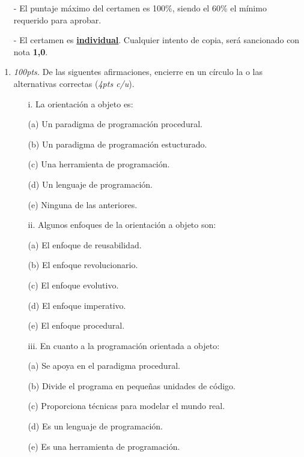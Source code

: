 \documentclass[10pt]{article}
\begin{document}
{\scriptsize
\begin{itemize}
    \item[-] El puntaje m\'aximo del certamen es 100\%, siendo el 60\% el m\'inimo requerido para aprobar.
    \item[-] El certamen es \underline{\textbf{individual}}. Cualquier intento de copia, ser\'a sancionado con nota \textbf{1,0}.
\end{itemize}
\vspace*{10pt}

\vspace*{-30pt}

\begin{enumerate}

    \item \emph{100pts.} De las siguentes afirmaciones, encierre en un c\'irculo la o las alternativas correctas (\emph{4pts c/u}).
    \begin{multicols}{2}

	\begin{enumerate}[label=(\alph*)]
        \item[i.] La orientaci\'on a objeto es: 
        \item[(a)] Un paradigma de programaci\'on procedural.
        \item[(b)] Un paradigma de programaci\'on estucturado.
        \item[(c)] Una herramienta de programaci\'on.
        \item[(d)] Un lenguaje de programaci\'on.
        \item[(e)] Ninguna de las anteriores.
    \end{enumerate}

    \begin{enumerate}[label=(\alph*)]
        \item[ii.] Algunos enfoques de la orientaci\'on a objeto son:
        \item[(a)] El enfoque de reusabilidad.
        \item[(b)] El enfoque revolucionario.
        \item[(c)] El enfoque evolutivo.
        \item[(d)] El enfoque imperativo.
        \item[(e)] El enfoque procedural.
    \end{enumerate}

    \begin{enumerate}[label=(\alph*)]
        \item[iii.] En cuanto a la programaci\'on orientada a objeto:
        \item[(a)] Se apoya en el paradigma procedural.
        \item[(b)] Divide el programa en peque\~nas unidades de c\'odigo.
        \item[(c)] Proporciona t\'ecnicas para modelar el mundo real.
        \item[(d)] Es un lenguaje de programaci\'on.
        \item[(e)] Es una herramienta de programaci\'on.
    \end{enumerate}


\end{multicols}
\end{enumerate}}
\end{document}
